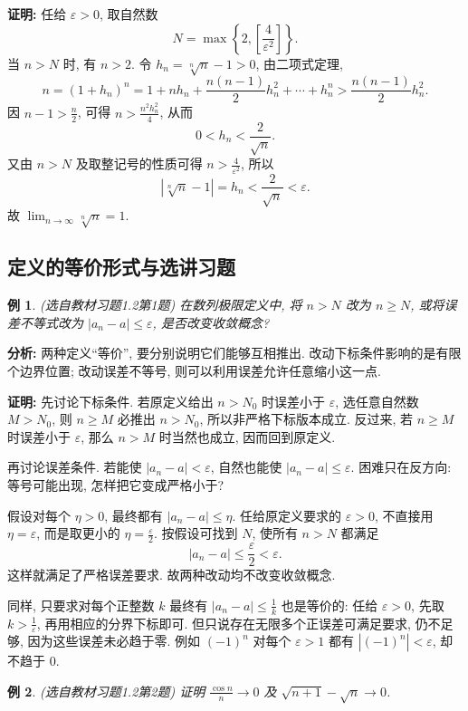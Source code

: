 \documentclass[UTF8,openany]{ctexbook}
\theoremstyle{chinesetextbook}
\newtheorem{example}{例}[section]
\newenvironment{cnproof}{\par\indent\textbf{证明:} \ignorespaces}{\par}
\begin{document}
\begin{cnproof}
任给 $\varepsilon>0$, 取自然数
\[
N=\max\left\{2,\left[\frac4{\varepsilon^2}\right]\right\}.
\]
当 $n>N$ 时, 有 $n>2$. 令 $h_n=\sqrt[n]{n}-1>0$, 由二项式定理,
\[
n=(1+h_n)^n
=1+nh_n+\frac{n(n-1)}2h_n^2+\cdots+h_n^n
>\frac{n(n-1)}2h_n^2.
\]
因 $\displaystyle n-1>\frac{n}{2}$, 可得 $\displaystyle n>\frac{n^2h_n^2}{4}$, 从而
\[
0<h_n<\frac2{\sqrt n}.
\]
又由 $n>N$ 及取整记号的性质可得 $\displaystyle n>\frac{4}{\varepsilon^2}$, 所以
\[
\left|\sqrt[n]{n}-1\right|
=h_n<\frac2{\sqrt n}<\varepsilon.
\]
故 $\displaystyle \lim_{n\to\infty}\sqrt[n]{n}=1$.
\end{cnproof}

\subsection{定义的等价形式与选讲习题}
\begin{example}
(选自教材习题1.2第1题) 在数列极限定义中, 将 $n>N$ 改为 $n\ge N$, 或将误差不等式改为 $|a_n-a|\le\varepsilon$, 是否改变收敛概念?
\end{example}
\par\indent\textbf{分析:} 两种定义“等价”, 要分别说明它们能够互相推出. 改动下标条件影响的是有限个边界位置; 改动误差不等号, 则可以利用误差允许任意缩小这一点.
\begin{cnproof}
先讨论下标条件. 若原定义给出 $n>N_0$ 时误差小于 $\varepsilon$, 选任意自然数 $M>N_0$, 则 $n\ge M$ 必推出 $n>N_0$, 所以非严格下标版本成立. 反过来, 若 $n\ge M$ 时误差小于 $\varepsilon$, 那么 $n>M$ 时当然也成立, 因而回到原定义. 

再讨论误差条件. 若能使 $|a_n-a|<\varepsilon$, 自然也能使 $|a_n-a|\le\varepsilon$. 困难只在反方向: 等号可能出现, 怎样把它变成严格小于?

假设对每个 $\eta>0$, 最终都有 $|a_n-a|\le\eta$. 任给原定义要求的 $\varepsilon>0$, 不直接用 $\eta=\varepsilon$, 而是取更小的 $\displaystyle\eta=\frac\varepsilon2$. 按假设可找到 $N$, 使所有 $n>N$ 都满足
\[
|a_n-a|\le\frac\varepsilon2<\varepsilon.
\]
这样就满足了严格误差要求. 故两种改动均不改变收敛概念.
\end{cnproof}
同样, 只要求对每个正整数 $k$ 最终有 $\displaystyle |a_n-a|\le\frac1k$ 也是等价的: 任给 $\varepsilon>0$, 先取 $\displaystyle k>\frac1\varepsilon$, 再用相应的分界下标即可. 但只说存在无限多个正误差可满足要求, 仍不足够, 因为这些误差未必趋于零. 例如 $(-1)^n$ 对每个 $\varepsilon>1$ 都有 $|(-1)^n|<\varepsilon$, 却不趋于 $0$.
\begin{example}
(选自教材习题1.2第2题) 证明 $\displaystyle \frac{\cos n}{n}\to0$ 及 $\sqrt{n+1}-\sqrt n\to0$.
\end{example}
\end{document}

